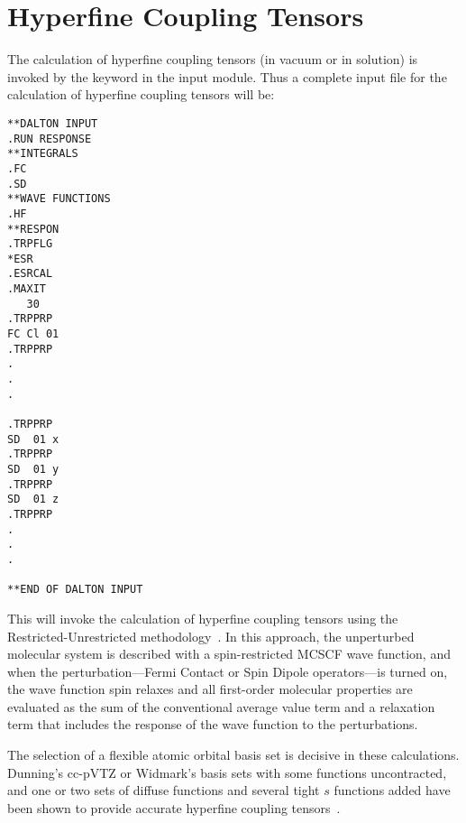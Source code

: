 \section{Hyperfine Coupling Tensors}

\begin{center}
\end{center}

    The calculation of hyperfine coupling tensors (in vacuum or in
solution) is invoked by the keyword  in the 
input module. Thus a complete input file for the calculation of
hyperfine coupling tensors will be:

\begin{verbatim}
**DALTON INPUT
.RUN RESPONSE
**INTEGRALS
.FC
.SD
**WAVE FUNCTIONS
.HF
**RESPON
.TRPFLG
*ESR
.ESRCAL
.MAXIT
   30
.TRPPRP
FC Cl 01
.TRPPRP
.
.
.

.TRPPRP
SD  01 x
.TRPPRP
SD  01 y
.TRPPRP
SD  01 z
.TRPPRP
.
.
.

**END OF DALTON INPUT
\end{verbatim}

    This will invoke the calculation of hyperfine
coupling tensors
using the Restricted-Unrestricted
methodology~\cite{bfpjjbjothhjajjcp97}. In this approach, the
unperturbed molecular system is described with a spin-restricted MCSCF
wave function, and when the perturbation---Fermi Contact or Spin Dipole
operators---is turned on, the wave function spin relaxes and all
first-order molecular properties are evaluated as the sum of the
conventional average value term and a relaxation term that includes
the response of the wave function to the perturbations.

    The selection of a flexible atomic orbital basis set is decisive
in these calculations. Dunning's cc-pVTZ or Widmark's basis sets with some
functions uncontracted, and one or two sets of diffuse functions and
several tight $s$ functions added have been shown to provide accurate
hyperfine coupling tensors~\cite{bfpjcpl232}.

